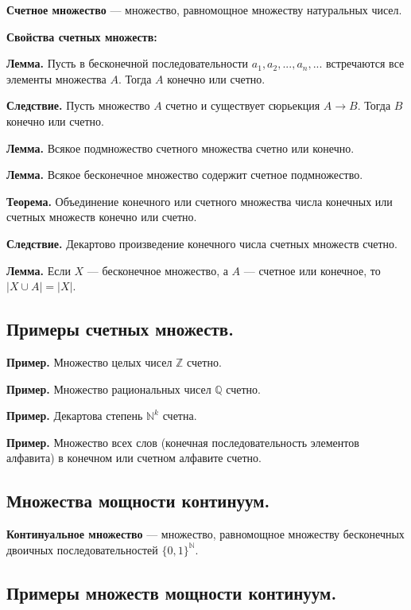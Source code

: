 \documentclass[a4paper, 10pt]{article}
\begin{document}
\textbf{Счетное множество} --- множество, равномощное множеству натуральных чисел.

\vspace{2mm}

\textbf{Свойства счетных множеств:}

\textbf{Лемма.} Пусть в бесконечной последовательности $a_1,a_2,...,a_n,...$ встречаются все элементы множества $A$. Тогда $A$ конечно или счетно.

\textbf{Следствие.} Пусть множество $A$ счетно и существует сюрьекция $A \to B$. Тогда $B$ конечно или счетно.

\textbf{Лемма.} Всякое подмножество счетного множества счетно или конечно.

\textbf{Лемма.} Всякое бесконечное множество содержит счетное подмножество.

\textbf{Теорема.} Объединение конечного или счетного множества числа конечных или счетных множеств конечно или счетно.

\textbf{Следствие.} Декартово произведение конечного числа счетных множеств счетно.

\textbf{Лемма.} Если $X$ --- бесконечное множество, а $A$ --- счетное или конечное, то $|X \cup A|=|X|$.


\subsection{Примеры счетных множеств.}

\textbf{Пример.} Множество целых чисел $\mathbb{Z}$ счетно.

\textbf{Пример.} Множество рациональных чисел $\mathbb{Q}$ счетно.

\textbf{Пример.} Декартова степень $\mathbb{N}^k$ счетна.

\textbf{Пример.} Множество всех слов (конечная последовательность элементов алфавита) в конечном или счетном алфавите счетно.


\subsection{Множества мощности континуум.}

\textbf{Континуальное множество} --- множество, равномощное множеству бесконечных двоичных последовательностей $\{0, 1\}^{\mathbb{N}}$.


\subsection{Примеры множеств мощности континуум.}
\end{document}
